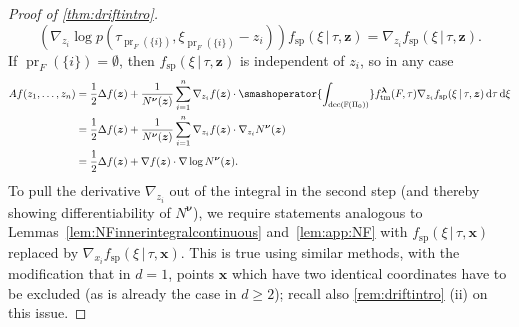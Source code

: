\documentclass[reqno,draft]{amsart}
\numberwithin{equation}{section}
\theoremstyle{plain}
\newtheorem{lemma}[theorem]{Lemma}
\theoremstyle{remark}
\newcommand{\R}{\mathbb{R}} %
\newcommand{\Z}{\mathbb{Z}} %
\newcommand*\diff{\mathop{}\!\mathrm{d}}
\newcommand{\e}{\mathrm{e}}
\DeclareMathOperator{\pr}{pr}
\newcommand{\fpart}{\Pi} %
\DeclareMathOperator{\dcb}{dec}
\newcommand{\ftm}{f_\mathrm{tm}^{\boldsymbol \lambda}}
\newcommand{\fsp}{f_\mathrm{sp}}
\begin{document}
\begin{proof}[Proof of \cref{thm:driftintro}]
\[        (\nabla _{z_i} \log p(\tau_{\pr_F(\{i\})},\xi_{\pr_F(\{i\})} - z_i)) \fsp(\xi \,\vert\,\tau,\boldsymbol z) = \nabla _{z_i} \fsp(\xi \,\vert\,\tau,\boldsymbol z).
    \] If $\pr_F(\{i\}) = \emptyset $, then $\fsp(\xi \,\vert\,\tau,\boldsymbol z)$ is independent of $z_i$, so in any case
    \begin{align*}
        A f(z_1, \ldots ,z_n)
        &= \frac{1}{2}\Delta f(\boldsymbol z) + \frac{1}{N^{\boldsymbol \nu}(\boldsymbol z)} \sum_{i=1}^n \nabla_{z_i} f(\boldsymbol z)\cdot \smashoperator{\int_{\dcb(\mathbb{F}(\fpart_0))}} \ftm(F,\tau) \nabla _{z_i} \fsp(\xi \,\vert\,\tau,\boldsymbol z) \diff \tau \diff \xi\\
        &= \frac{1}{2}\Delta f(\boldsymbol z) + \frac{1}{N^{\boldsymbol \nu}(\boldsymbol z)} \sum_{i=1}^n \nabla_{z_i} f(\boldsymbol z) \cdot \nabla_{z_i} N^{\boldsymbol \nu}(\boldsymbol z)\\
        &= \frac{1}{2}\Delta f(\boldsymbol z) + \nabla f(\boldsymbol z) \cdot \nabla \log N^{\boldsymbol \nu}(\boldsymbol z).
    \end{align*}
To pull the derivative $\nabla _{z_i}$ out of the integral in the second step (and thereby showing differentiability of $N^{\boldsymbol \nu}$), we require statements analogous to Lemmas~\ref{lem:NFinnerintegralcontinuous} and~\ref{lem:app:NF}
    with $\fsp(\xi \,\vert\,\tau,\boldsymbol x)$ replaced by $\nabla _{x_i} \fsp(\xi \,\vert\,\tau,\boldsymbol x)$. This is true using similar methods, with the modification that in $d = 1$, points $\boldsymbol x$ which have two identical coordinates have to be excluded (as is already the case in $d \ge 2$); recall also \cref{rem:driftintro} (ii) on this issue.
\end{proof}

%
\end{document}
